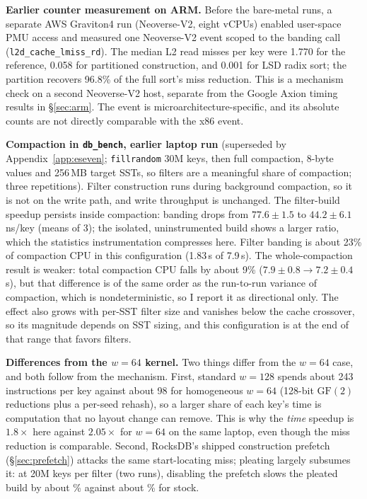 \documentclass{article}
\begin{document}
\textbf{Earlier counter measurement on ARM.} Before the bare-metal runs, a separate AWS Graviton4 run (Neoverse-V2, eight vCPUs) enabled user-space PMU access and measured
one Neoverse-V2 event scoped to the banding call (\texttt{l2d\_cache\_\allowbreak lmiss\_rd}). The median L2 read misses per key were
1.770 for the reference, 0.058 for partitioned construction, and 0.001 for LSD radix sort; the
partition recovers 96.8\% of the full sort's miss reduction. This is a mechanism check on a second
Neoverse-V2 host, separate from the Google Axion timing results in \S\ref{sec:arm}. The event is
microarchitecture-specific, and its absolute counts are not directly comparable with the x86 event.

\textbf{Compaction in \texttt{db\_bench}, earlier laptop run} (superseded by Appendix~\ref{app:eseven}; \texttt{fillrandom} 30M keys, then full
compaction, 8-byte values and 256\,MB target SSTs, so filters are a meaningful share of compaction;
three repetitions). Filter construction runs during
background compaction, so it is not on the write path, and write throughput is unchanged. The
filter-build speedup persists inside
compaction: banding drops from $77.6\pm1.5$ to $44.2\pm6.1$ ns/key (means of 3); the isolated,
uninstrumented build shows a larger ratio, which the statistics
instrumentation compresses here. Filter banding is about 23\% of compaction CPU in this configuration (1.83\,s of
7.9\,s). The whole-compaction
result is weaker: total compaction CPU falls by about 9\% ($7.9\pm0.8 \to 7.2\pm0.4$\,s), but that difference is
of the same order as the run-to-run variance of compaction, which is nondeterministic, so I
report it as directional only. The effect also grows with per-SST filter size and
vanishes below the cache crossover, so its magnitude depends on SST sizing, and this configuration
is at the end of that range that favors filters.

\textbf{Differences from the $w=64$ kernel.} Two things differ from the $w=64$ case, and both follow from the mechanism. First, standard
$w=128$ spends about 243 instructions per key against about 98 for homogeneous
$w=64$ (128-bit \(\mathrm{GF}(2)\) reductions plus a per-seed rehash), so a larger share of each key's
time is computation that no layout change can remove. This is why the \emph{time} speedup
is $1.8\times$ here against $2.05\times$ for $w=64$ on the same laptop, even though the miss reduction is comparable. Second, RocksDB's shipped construction
prefetch (\S\ref{sec:prefetch}) attacks the same start-locating miss; pleating largely subsumes it: at 20M keys
per filter (two runs), disabling the prefetch slows the pleated build by about \etwonopfpleated\% against about \etwonopfstock\% for stock.
\end{document}
